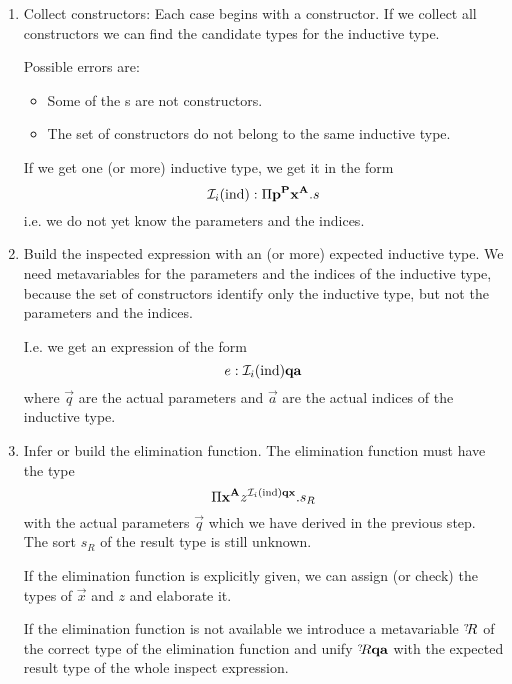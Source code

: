 \begin{enumerate}
\item
    Collect constructors: Each case begins with a constructor. If we collect
    all constructors we can find the candidate types for the inductive type.

    Possible errors are:

    \begin{itemize}
        \item Some of the s are not constructors.
        \item The set of constructors do not belong to the same inductive type.
    \end{itemize}

    If we get one (or more) inductive type, we get it in the form
    $$
        {\cal I }_i (\text{ind})
        :
        \Pi \mathbf{p}^{\mathbf{P}} \mathbf{x}^{\mathbf{A}} . s
    $$
    i.e. we do not yet know the parameters and the indices.

\item
    Build the inspected expression  with an (or more) expected inductive
    type. We need metavariables for the parameters and the indices of the
    inductive type, because the set of constructors identify only the
    inductive type, but not the parameters and the indices.

    I.e. we get an expression of the form
    $$
        e: {\cal I }_i (\text{ind}) \mathbf{q} \mathbf{a}
    $$
    where $\vec{q}$ are the actual parameters and $\vec{a}$ are the actual
    indices of the inductive type.

\item
    Infer or build the elimination function. The elimination function must have
    the type
    $$
        \Pi \mathbf{x}^{\mathbf{A}} z^{{\cal I }_i (\text{ind}) \mathbf{q} \mathbf{x}} . s_R
    $$
    with the actual parameters $\vec{q}$ which we have derived in the previous
    step. The sort $s_R$ of the result type is still unknown.

    If the elimination function is explicitly given, we can assign (or check)
    the types of $\vec{x}$ and $z$ and elaborate it.

    If the elimination function is not available we introduce a metavariable
    $\meta{R}$ of the correct type of the elimination function and unify
    $\meta{R}
    \vec{q} \vec{a}$ with the expected result type of the whole inspect
    expression.
\end{enumerate}








